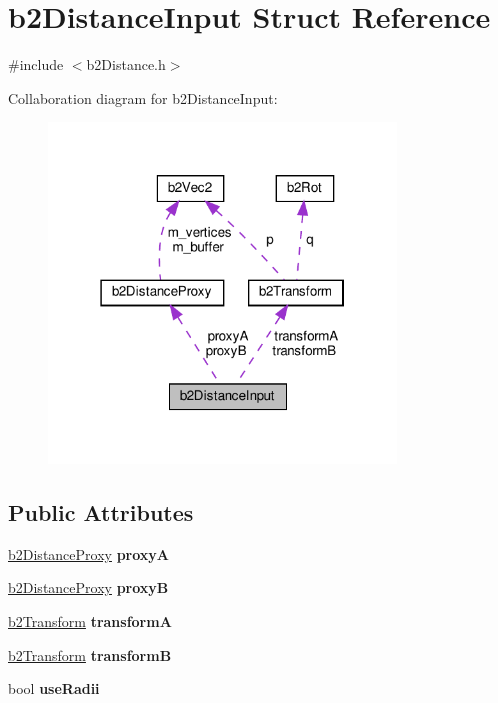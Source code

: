 \hypertarget{structb2DistanceInput}{}\section{b2\+Distance\+Input Struct Reference}
\label{structb2DistanceInput}


{\ttfamily \#include $<$b2\+Distance.\+h$>$}



Collaboration diagram for b2\+Distance\+Input\+:
\nopagebreak
\begin{figure}[H]
\begin{center}
\leavevmode
\includegraphics[width=262pt]{structb2DistanceInput__coll__graph}
\end{center}
\end{figure}
\subsection*{Public Attributes}
\begin{DoxyCompactItemize}
\item 
\mbox{\label{structb2DistanceInput_a84d378f4f0e2f06fbe03d413e9dfbbd9}} 
\hyperlink{structb2DistanceProxy}{b2\+Distance\+Proxy} {\bfseries proxyA}
\item 
\mbox{\label{structb2DistanceInput_ad08521a9cdf9d418ececfd44de83a5d3}} 
\hyperlink{structb2DistanceProxy}{b2\+Distance\+Proxy} {\bfseries proxyB}
\item 
\mbox{\label{structb2DistanceInput_a0889c2f7120ba521d6e40e2a22834ddb}} 
\hyperlink{structb2Transform}{b2\+Transform} {\bfseries transformA}
\item 
\mbox{\label{structb2DistanceInput_a47352d7c5b3db80b2fb8cf338f1c1895}} 
\hyperlink{structb2Transform}{b2\+Transform} {\bfseries transformB}
\item 
\mbox{\label{structb2DistanceInput_ab72a770be4a91997d00112409de5fea7}} 
bool {\bfseries use\+Radii}
\end{DoxyCompactItemize}


